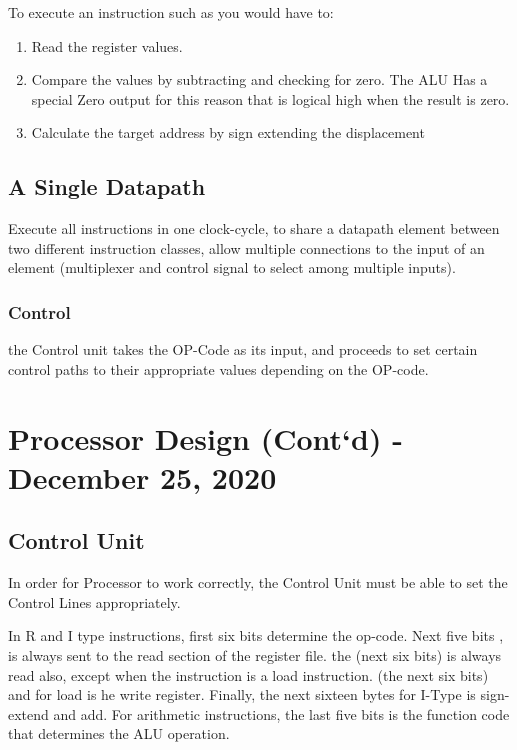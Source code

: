 \documentclass[11pt,a4paper,twocolumn]{book}
\begin{document}
To execute an instruction such as  you would have to:

\begin{enumerate}
\item Read the register values.
\item Compare the values by subtracting and checking for zero. The ALU Has a special Zero output for this reason that is logical high when the result is zero.
\item Calculate the target address by sign extending the displacement 
\end{enumerate}

\section{A Single Datapath}

Execute all instructions in one clock-cycle, to share a datapath element between two different instruction classes, allow multiple connections to the input of an element (multiplexer and control signal to select among multiple inputs).

\subsection{Control}

the Control unit takes the OP-Code as its input, and proceeds to set certain control paths to their appropriate values depending on the OP-code.

\chapter{Processor Design (Cont`d) - December 25, 2020}

\section{Control Unit}

In order for Processor to work correctly, the Control Unit must be able to set the Control Lines appropriately.

In R and I type instructions, first  six bits determine the op-code. Next five bits , is always sent to the read section of the register file. the  (next six bits) is always read also, except when the instruction is a load instruction.  (the next six bits) and  for load is he write register. Finally, the next sixteen bytes for I-Type is sign-extend and add. For arithmetic instructions, the last five bits is the function code that determines the ALU operation.\\
\end{document}
